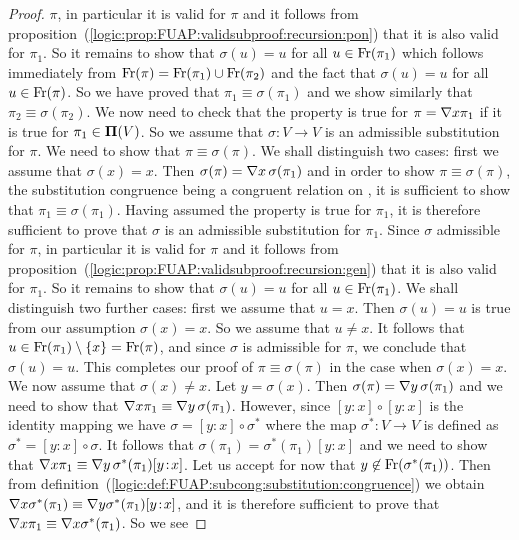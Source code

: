 \begin{proof}
$\pi$, in particular it is valid for $\pi$ and it follows from
proposition~(\ref{logic:prop:FUAP:validsubproof:recursion:pon}) that
it is also valid for $\pi_{1}$. So it remains to show that
$\sigma(u)=u$ for all $u\in\mbox{\rm Fr}(\pi_{1})$ which follows immediately
from $\mbox{\rm Fr}(\pi)=\mbox{\rm Fr}(\pi_{1})\cup\mbox{\rm Fr}(\pi_{2})$ and the fact that
$\sigma(u)=u$ for all $u\in\mbox{\rm Fr}(\pi)$. So we have proved that
$\pi_{1}\equiv\sigma(\pi_{1})$ and we show similarly that
$\pi_{2}\equiv\sigma(\pi_{2})$. We now need to check that the
property is true for $\pi=\mbox{$\nabla$} x\pi_{1}$ if it is true for
$\pi_{1}\in\mbox{${\bf\Pi}(V)$}$. So we assume that $\sigma:V\to V$ is an admissible
substitution for $\pi$. We need to show that $\pi\equiv\sigma(\pi)$.
We shall distinguish two cases: first we assume that $\sigma(x)=x$.
Then $\sigma(\pi)=\mbox{$\nabla$} x\,\sigma(\pi_{1})$ and in order to show
$\pi\equiv\sigma(\pi)$, the substitution congruence being a
congruent relation on \pvs, it is sufficient to show that
$\pi_{1}\equiv\sigma(\pi_{1})$. Having assumed the property is true
for $\pi_{1}$, it is therefore sufficient to prove that $\sigma$ is
an admissible substitution for $\pi_{1}$. Since $\sigma$ admissible
for $\pi$, in particular it is valid for $\pi$ and it follows from
proposition~(\ref{logic:prop:FUAP:validsubproof:recursion:gen}) that
it is also valid for $\pi_{1}$. So it remains to show that
$\sigma(u)=u$ for all $u\in\mbox{\rm Fr}(\pi_{1})$. We shall distinguish two
further cases: first we assume that $u=x$. Then $\sigma(u)=u$ is
true from our assumption $\sigma(x)=x$. So we assume that $u\neq x$.
It follows that $u\in\mbox{\rm Fr}(\pi_{1})\setminus\{x\}=\mbox{\rm Fr}(\pi)$, and
since $\sigma$ is admissible for $\pi$, we conclude that
$\sigma(u)=u$. This completes our proof of $\pi\equiv\sigma(\pi)$ in
the case when $\sigma(x)=x$. We now assume that $\sigma(x)\neq x$.
Let $y=\sigma(x)$. Then $\sigma(\pi)=\mbox{$\nabla$} y\,\sigma(\pi_{1})$ and we
need to show that $\mbox{$\nabla$} x\pi_{1}\equiv\mbox{$\nabla$} y\,\sigma(\pi_{1})$.
However, since $[y\!:\!x]\circ[y\!:\!x]$ is the identity mapping we
have $\sigma=[y\!:\!x]\circ\sigma^{*}$ where the map
$\sigma^{*}:V\to V$ is defined as $\sigma^{*}=[y\!:\!x]\circ\sigma$.
It follows that $\sigma(\pi_{1})=\sigma^{*}(\pi_{1})[y\!:\!x]$ and
we need to show that $\mbox{$\nabla$} x\pi_{1}\equiv\mbox{$\nabla$}
y\,\sigma^{*}(\pi_{1})[y\!:\!x]$. Let us accept for now that
$y\not\in\mbox{\rm Fr}(\sigma^{*}(\pi_{1}))$. Then from
definition~(\ref{logic:def:FUAP:subcong:substitution:congruence}) we
obtain $\mbox{$\nabla$} x\sigma^{*}(\pi_{1})\equiv\mbox{$\nabla$}
y\sigma^{*}(\pi_{1})[y\!:\!x]$, and it is therefore sufficient to
prove that $\mbox{$\nabla$} x\pi_{1}\equiv\mbox{$\nabla$} x\sigma^{*}(\pi_{1})$. So we see

\end{proof}
